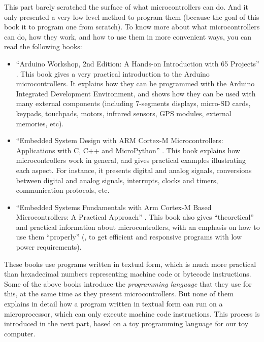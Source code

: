 This part barely scratched the surface of what microcontrollers can do. And it
only presented a very low level method to program them (because the goal of
this book it to program one from scratch). To know more about what
microcontrollers can do, how they work, and how to use them in more convenient
ways, you can read the following books:
\begin{itemize}
  \item ``Arduino Workshop, 2nd Edition: A Hands-on Introduction with 65
  Projects'' \cite{ArduinoWorkshop}. This book gives a very practical
  introduction to the Arduino microcontrollers. It explains how they can be
  programmed with the Arduino Integrated Development Environment, and shows how
  they can be used with many external components (including 7-segments
  displays, micro-SD cards, keypads, touchpads, motors, infrared sensors,
  GPS modules, external memories, etc).

  \item ``Embedded System Design with ARM Cortex-M Microcontrollers:
  Applications with C, C++ and MicroPython'' \cite{EmbeddedSystemDesign}. This
  book explains how microcontrollers work in general, and gives practical
  examples illustrating each aspect. For instance, it presents digital and
  analog signals, conversions between digital and analog signals, interrupts,
  clocks and timers, communication protocols, etc.

  \item ``Embedded Systems Fundamentals with Arm Cortex-M Based
  Microcontrollers: A Practical Approach'' \cite{EmbeddedSystemsFundamentals}.
  This book also gives ``theoretical'' and practical information about
  microcontrollers, with an emphasis on how to use them ``properly'' (\ie, to
  get efficient and responsive programs with low power requirements).
\end{itemize}

These books use programs written in textual form, which is much more
practical than hexadecimal numbers representing machine code or bytecode
instructions. Some of the above books introduce the {\em programming language}
that they use for this, at the same time as they present microcontrollers. But
none of them explains in detail how a program written in textual form can run
on a microprocessor, which can only execute machine code instructions. This
process is introduced in the next part, based on a toy programming language for
our toy computer.